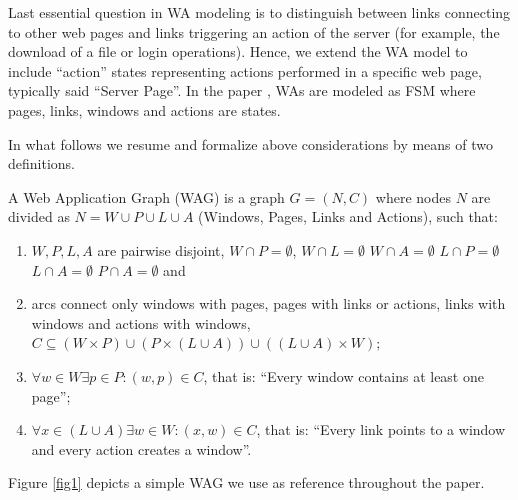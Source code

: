 Last essential question in WA modeling is to distinguish between links connecting to other web pages and links triggering an action of the server (for example, the download of a file or login operations). Hence, we extend the WA model to include ``action'' states representing actions performed in a specific web page, typically said ``Server Page''. In the paper \cite{disc-doni-mong-tota-cast}, WAs are modeled as FSM where pages, links, windows and actions are states. 

In what follows we resume and formalize above considerations by means of two definitions.

\footnotesize
\begin{definition}\label{def:graph}
A Web Application Graph (WAG) is a graph $G=(N,C)$ where nodes $N$ are divided as
$N=W \cup P \cup L \cup A$ (Windows, Pages, Links and Actions), such that:
\begin{enumerate}
   \item $W, P, L, A$ are pairwise disjoint, \ie $W \cap P= \emptyset$, $W
   \cap L= \emptyset$ $W \cap A = \emptyset$ $L \cap P = \emptyset$ 
   $L \cap A = \emptyset$ $P \cap A = \emptyset$ and

   \item arcs connect only windows with pages, pages with links or actions, 
   links with windows and actions with windows, \ie $C \subseteq (W \times P) 
   \cup (P  \times (L \cup A)) \cup((L \cup A) \times W)$;

	 \item$\forall w \in W \exists p \in P : (w,p) \in C$, that is: ``Every
	 window contains at least one page'';
 
 	 \item $\forall x \in (L \cup A) \exists w \in W : (x,w) \in C$, that is: ``Every link points
   to a window and every action creates a window''.
\end{enumerate}
\end{definition}

\normalsize

Figure \ref{fig1} depicts a simple WAG we use as reference throughout the paper.

